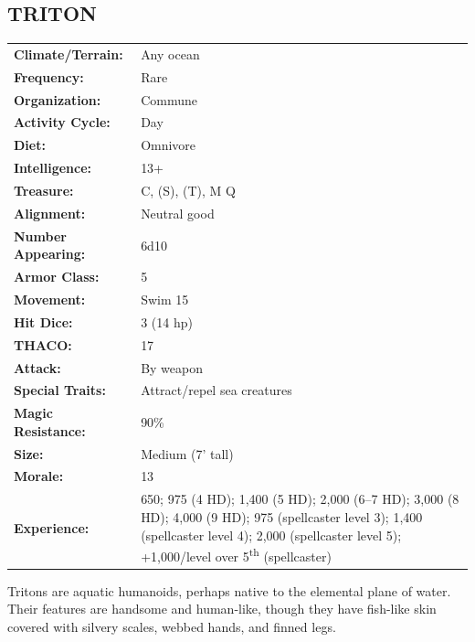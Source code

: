 \begin{multicols}{2}
\noindent
\begin{minipage}{\columnwidth}

\vspace{1em}

\subsection{TRITON}

\noindent \begin{tabular}{p{}p{}}
\textbf{Climate/Terrain:}	& Any ocean	\\
\textbf{Frequency:} 		& Rare	\\
\textbf{Organization:} 		& Commune	\\
\textbf{Activity Cycle:} 	& Day	\\
\textbf{Diet:} 				& Omnivore	\\
\textbf{Intelligence:} 		& 13+	\\
\textbf{Treasure:} 			& C, (S), (T), M Q	\\
\textbf{Alignment:} 		& Neutral good	\\
\hline
\textbf{Number Appearing:} 	& 6d10	\\
\textbf{Armor Class:} 		& 5	\\
\textbf{Movement:} 			& Swim 15	\\
\textbf{Hit Dice:} 			& 3 (14 hp)	\\
\textbf{THACO:} 			& 17	\\
\textbf{Attack:} 			& By weapon	\\
\textbf{Special Traits:} & Attract/repel sea creatures	\\
\textbf{Magic Resistance:} 	& 90\%	\\
\textbf{Size:} 				& Medium (7' tall)	\\
\textbf{Morale:} 			& 13	\\
\textbf{Experience:} 		& 650; 975 (4 HD); 1,400 (5 HD); 2,000 (6--7 HD); 3,000 (8 HD); 4,000 (9 HD); 975 (spellcaster level 3); 1,400 (spellcaster level 4); 2,000 (spellcaster level 5); +1,000/level over 5\textsuperscript{th} (spellcaster)	\\ %
\end{tabular}

\end{minipage}

Tritons are aquatic humanoids, perhaps native to the elemental plane of water. Their features are handsome and human-like, though they have fish-like skin covered with silvery scales, webbed hands, and finned legs. 


\end{multicols}
